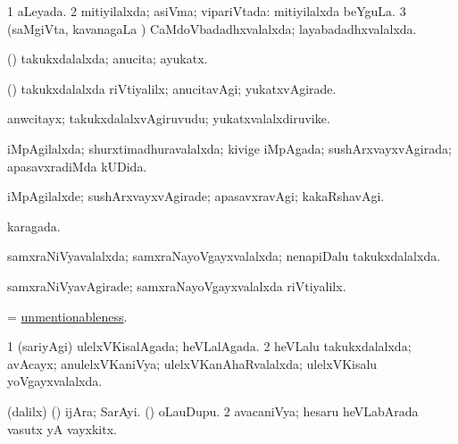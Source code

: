 \bentry
{} 
\gl{\gu}
\expl{}
\bmng
\bnum
\num{1} aLeyada. 
\num{2} mitiyilalxda; asiVma; vipariVtada:  mitiyilalxda beYguLa. 
\num{3} (saMgiVta, kavanagaLa \vi) CaMdoVbadadhxvalalxda; layabadadhxvalalxda. 
\enum
\emng
\eentry

\bentry
{} 
\gl{\gu}
\bmng
(\pArxparx) takukxdalalxda; anucita; ayukatx. 
\emng
\eentry

\bentry
{} 
\gl{\kirxvi}
\expl{}
\bmng
(\pArxparx) takukxdalalxda riVtiyalilx; anucitavAgi; yukatxvAgirade. 
\emng
\eentry

\bentry
{} 
\gl{\nA}
\expl{}
\bmng
anwcitayx; takukxdalalxvAgiruvudu; yukatxvalalxdiruvike. 
\emng
\eentry

\bentry
{} 
\gl{\gu}
\expl{}
\bmng
iMpAgilalxda; shurxtimadhuravalalxda; kivige iMpAgada; sushArxvayxvAgirada; apasavxradiMda kUDida. 
\emng
\eentry

\bentry
{} 
\gl{\kirxvi}
\expl{}
\bmng
iMpAgilalxde; sushArxvayxvAgirade; apasavxravAgi; kakaRshavAgi. 
\emng
\eentry

\bentry
{} 
\gl{\gu}
\expl{}
\bmng
karagada. 
\emng
\eentry

\bentry
{} 
\gl{\gu}
\expl{}
\bmng
samxraNiVyavalalxda; samxraNayoVgayxvalalxda; nenapiDalu takukxdalalxda. 
\emng
\eentry

\bentry
{} 
\gl{\kirxvi}
\expl{}
\bmng
samxraNiVyavAgirade; samxraNayoVgayxvalalxda riVtiyalilx. 
\emng
\eentry

\bentry
{} 
\gl{\nA}
\expl{}
\bmng
= \hyperlink{unmentionableness}{unmentionableness}. 
\emng
\eentry

\bentry
{} 
\gl{\gu}
\expl{}
\bmng
\bnum
\num{1} (sariyAgi) ulelxVKisalAgada; heVLalAgada. 
\num{2} heVLalu takukxdalalxda; avAcayx; anulelxVKaniVya; ulelxVKanAhaRvalalxda; ulelxVKisalu yoVgayxvalalxda. 
\enum
\emng
\eentry

\bentry
{} 
\gl{\nA}
\expl{}
\bmng
\bnum
{} 
\banum
{} (\bava dalilx) (\pArxparx) ijAra; SarAyi. 
 (\hA) oLauDupu. 
\eanum
\numie
\num{2} avacaniVya; hesaru heVLabArada vasutx yA vayxkitx. 
\enum
\emng
\eentry

